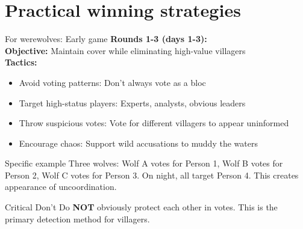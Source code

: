 \documentclass[10pt]{beamer}
\begin{document}

\section{Practical winning strategies}

\begin{frame}{For werewolves: Early game}
  \textbf{Rounds 1-3 (days 1-3):} \\
  \textbf{Objective:} Maintain cover while eliminating high-value villagers \\
  \textbf{Tactics:}
    \begin{itemize}
      \item \alert{Avoid voting patterns}: Don't always vote as a bloc
      \item \alert{Target high-status players}: Experts, analysts, obvious leaders
      \item \alert{Throw suspicious votes}: Vote for different villagers to appear uninformed
      \item \alert{Encourage chaos}: Support wild accusations to muddy the waters
    \end{itemize}

  \begin{exampleblock}{Specific example}
    Three wolves: Wolf A votes for Person 1, Wolf B votes for Person 2, Wolf C votes for Person 3. On night, all target Person 4. This creates appearance of uncoordination.
  \end{exampleblock}

  \begin{alertblock}{Critical Don't}
    Do \textbf{NOT} obviously protect each other in votes. This is the primary detection method for villagers.
  \end{alertblock}
\end{frame}
\end{document}
